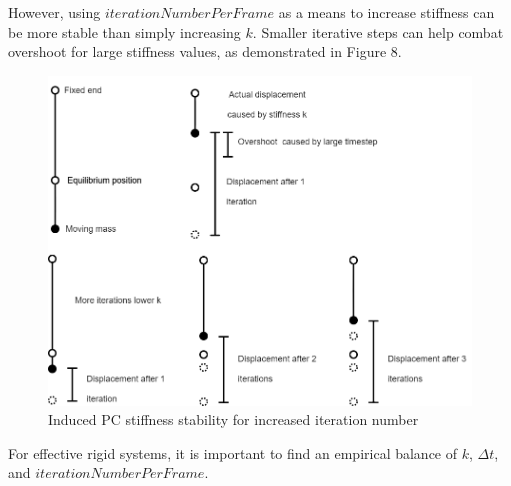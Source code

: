 \documentclass[12pt, letterpaper]{article}
\begin{document}
\noindent However, using $iterationNumberPerFrame$ as a means to increase stiffness can be more stable than simply increasing $k$. Smaller iterative steps can help combat overshoot for large stiffness values, as demonstrated in Figure 8. 
\begin{figure}[H]
\centering
\includegraphics[width=15cm]{pc stiffness exp 2.png}
\caption{Induced PC stiffness stability for increased iteration number}
\label{fig:figure}
\end{figure} 
\noindent For effective rigid systems, it is important to find an empirical balance of $k$, $\Delta t$, and $iterationNumberPerFrame$.
\end{document}
